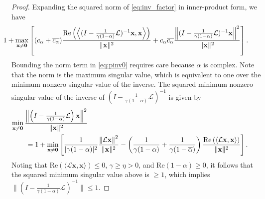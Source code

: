 \documentclass[review]{siamart}
\begin{document}
\begin{proof}
Expanding the squared norm of \eqref{eq:inv_factor} in inner-product form, we have
%
{\small
\begin{align}\label{eq:pinv0}
& \hspace{-5ex}
1 + \max_{\mathbf{x}\neq\mathbf{0}} \left[ (c_\alpha+\overline{c_\alpha})
	\frac{\textnormal{Re}\left(\left\langle (I - \tfrac{1}{\gamma(1-\alpha)}\mathcal{L})^{-1}\mathbf{x},
		\mathbf{x}\right\rangle\right)}{\|\mathbf{x}\|^2} +
	c_\alpha\overline{c_\alpha}
	\frac{\left\|(I - \tfrac{1}{\gamma(1-\alpha)}\mathcal{L})^{-1}\mathbf{x}\right\|^2}
		{\|\mathbf{x}\|^2} \right].
\end{align}
}
%
Bounding the norm term in \eqref{eq:pinv0} requires care because $\alpha$ is
complex. Note that the norm is the maximum singular value, which is equivalent to one
over the minimum nonzero singular value of the inverse. The squared minimum nonzero
singular value of the inverse of $(I - \tfrac{1}{\gamma(1-\alpha)}\mathcal{L})^{-1}$
is given by
%
\begin{align*}
&\hspace{-5ex}
\min_{\mathbf{x}\neq\mathbf{0}} \frac{\left\|\left(I - \tfrac{1}{\gamma(1-\alpha)}
	\mathcal{L}\right)\mathbf{x}\right\|^2}{\|\mathbf{x}\|^2} \\
& = 1 + \min_{\mathbf{x}\neq\mathbf{0}} \left[ \frac{1}{|\gamma(1-\alpha)|^2}
	\frac{\left\|\mathcal{L}\mathbf{x}\right\|^2}{\|\mathbf{x}\|^2}
	- \left(\frac{1}{\gamma(1-\alpha)} + \frac{1}{{\gamma}(1-\overline{\alpha})}\right)
	\frac{\textnormal{Re}\left(\left\langle\mathcal{L}\mathbf{x},\mathbf{x}\right\rangle\right)}
		{\|\mathbf{x}\|^2}\right].
\end{align*}
%
Noting that Re$\left(\langle\mathcal{L}\mathbf{x},\mathbf{x}\rangle\right) \leq 0$,
$\gamma \geq \eta > 0$, and Re$(1-\alpha) \geq 0$, it follows that the squared minimum
singular value above is $\geq 1$, which implies $\|(I - \tfrac{1}{\gamma(1-\alpha)}
\mathcal{L})^{-1}\| \leq 1$.



\end{proof}
\end{document}
